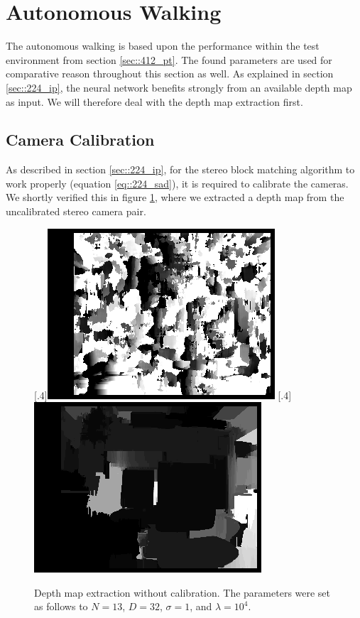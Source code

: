 \FloatBarrier
\section{Autonomous Walking}
\label{sec::42_aw}
The autonomous walking is based upon the performance within the test environment from section \ref{sec::412_pt}. The found parameters are used for comparative reason throughout this section as well. As explained in section \ref{sec::224_ip}, the neural network benefits strongly from an available depth map as input. We will therefore deal with the depth map extraction first.
\FloatBarrier
\subsection{Camera Calibration}
\label{sec::421_cc}
As described in section \ref{sec::224_ip}, for the stereo block matching algorithm to work properly (equation \ref{eq::224_sad}), it is required to calibrate the cameras. We shortly verified this in figure \ref{fig::421_no_calib}, where we extracted a depth map from the uncalibrated stereo camera pair.
\begin{figure}[h!]
	\centering
	[.4\linewidth]{\includegraphics[scale=.3]{chapters/04_experiments/02_autonomous_walking/02_depth_map_parameter_tuning/disp_no_calib.png}}
	[.4\linewidth]{\includegraphics[scale=.3]{chapters/04_experiments/02_autonomous_walking/02_depth_map_parameter_tuning/wls_no_calib.png}}
	\caption{Depth map extraction without calibration. The parameters were set as follows to $N=13$, $D=32$, $\sigma = 1$, and $\lambda=10^4$.}
	\label{fig::421_no_calib}
\end{figure}
